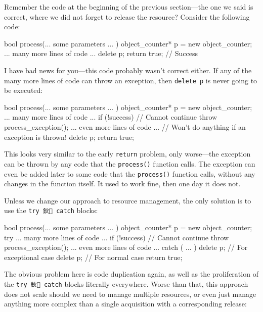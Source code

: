 Remember the code at the beginning of the previous section---the one we said is correct, where we did not forget to release the resource? Consider the following code:

\begin{code}
bool process(... some parameters ... ) {
  object_counter* p = new object_counter;
  ... many more lines of code ...
  delete p;
  return true;    // Success
}
\end{code}

I have bad news for you---this code probably wasn't correct either. If any of the many more lines of code can throw an exception, then \texttt{delete\ p} is never going to be executed:

\begin{code}
bool process(... some parameters ... ) {
  object_counter* p = new object_counter;
  ... many more lines of code ...
  if (!success) // Cannot continue
    throw process_exception();
  ... even more lines of code ...
  // Won't do anything if an exception is thrown!
  delete p;
  return true;
}
\end{code}

This looks very similar to the early \texttt{return} problem, only worse---the exception can be thrown by any code that the \texttt{process()} function calls. The exception can even be added later to some code that the \texttt{process()} function calls, without any changes in the function itself. It used to work fine, then one day it does not.

Unless we change our approach to resource management, the only solution is to use the \texttt{try\ 鈥 }\texttt{catch} blocks:

\begin{code}
bool process(... some parameters ... ) {
  object_counter* p = new object_counter;
  try {
    ... many more lines of code ...
    if (!success) // Cannot continue
      throw process_exception();
      ... even more lines of code ...
  } catch ( ... ) {
    delete p;    // For exceptional case
  }
  delete p;    // For normal case return true;
}
\end{code}

The obvious problem here is code duplication again, as well as the proliferation of the \texttt{try\ 鈥 catch} blocks literally everywhere. Worse than that, this approach does not scale should we need to manage multiple resources, or even just manage anything more complex than a single acquisition with a corresponding release:

